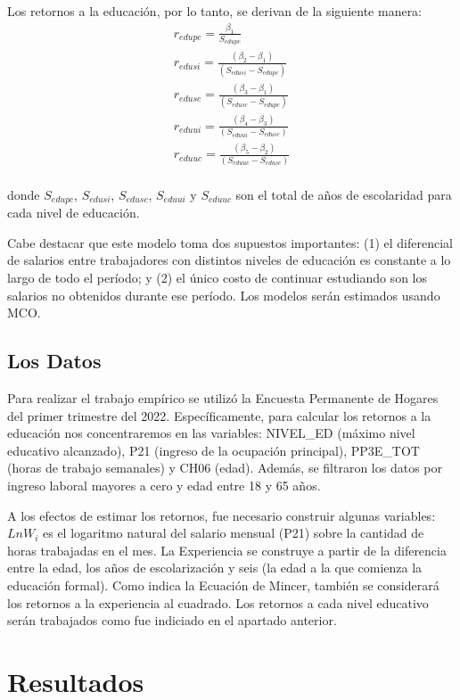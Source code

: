 \documentclass[a4paper]{article}
\theoremstyle{plain}
\theoremstyle{definition}
\begin{document}
Los retornos a la educación, por lo tanto, se derivan de la siguiente manera: 
\begin{gather*}
    r_{edupc}= \frac{\beta_1}{S_{edupc}}\\
    r_{edusi}= \frac{(\beta_2-\beta_1)}{(S_{edusi}-S_{edupc})}\\
    r_{edusc}= \frac{(\beta_3-\beta_1)}{(S_{edusc}-S_{edupc})}\\
    r_{eduui}= \frac{(\beta_4-\beta_3)}{(S_{eduui}-S_{edusc})}\\
    r_{eduuc}= \frac{(\beta_5-\beta_2)}{(S_{eduuc}-S_{edusc})}\\
\end{gather*}

donde $S_{edupc}$, $S_{edusi}$, $S_{edusc}$, $S_{eduui}$ y $S_{eduuc}$ son el total de años de escolaridad para cada nivel de educación.

Cabe destacar que este modelo toma dos supuestos importantes: (1) el diferencial de salarios entre trabajadores con distintos niveles de educación es constante a lo largo de todo el período; y (2) el único costo de continuar estudiando son los salarios no obtenidos durante ese período. Los modelos serán estimados usando MCO. 

\subsection{Los Datos}
\label{sec:concepts:sec2}

Para realizar el trabajo empírico se utilizó la Encuesta Permanente de Hogares del primer trimestre del 2022. Específicamente, para calcular los retornos a la educación nos concentraremos en las variables: NIVEL\_ED (máximo nivel educativo alcanzado), P21 (ingreso de la ocupación principal), PP3E\_TOT (horas de trabajo semanales) y CH06 (edad). Además, se filtraron los datos por ingreso laboral mayores a cero y edad entre 18 y 65 años.  

A los efectos de estimar los retornos, fue necesario construir algunas variables: $LnW_i$ es el logaritmo natural del salario mensual (P21) sobre la cantidad de horas trabajadas en el mes.  La Experiencia se construye a partir de la diferencia entre la edad, los años de escolarización y seis (la edad a la que comienza la educación formal). Como indica la Ecuación de Mincer, también se considerará los retornos a la experiencia al cuadrado. 
Los retornos a cada nivel educativo serán trabajados como fue indiciado en el apartado anterior.


\section{Resultados}
\label{sec:concepts:sec3}
\end{document}
